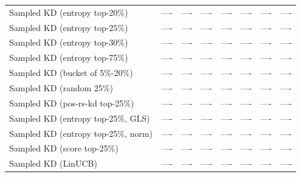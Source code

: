 \documentclass[11pt]{article}
\begin{document}
\begin{table}[t]
{\begin{tabular}{lccccccc}
		Sampled KD (entropy top-20\%)              & ----    & ----                  & ----                      & ----                 & ----                        & ----                    & ----          \\
		Sampled KD (entropy top-25\%)              & ----    & ----                  & ----                      & ----                 & ----                        & ----                    & ----          \\
		Sampled KD (entropy top-30\%)              & ----    & ----                  & ----                      & ----                 & ----                        & ----                    & ----          \\
		Sampled KD (entropy top-75\%)              & ----    & ----                  & ----                      & ----                 & ----                        & ----                    & ----          \\
		Sampled KD (bucket of 5\%-20\%)  		   & ----    & ----                  & ----                      & ----                 & ----                        & ----                    & ----          \\
		Sampled KD (random 25\%)         		   & ----    & ----                  & ----                      & ----                 & ----                        & ----                    & ----          \\
		Sampled KD (pos-rs-kd top-25\%)            & ----    & ----                  & ----                      & ----                 & ----                        & ----                    & ----          \\
		Sampled KD (entropy top-25\%, GLS) 		   & ----    & ----                  & ----                      & ----                 & ----                        & ----                    & ----          \\
		Sampled KD (entropy top-25\%, norm)		   & ----    & ----                  & ----                      & ----                 & ----                        & ----                    & ----          \\
		Sampled KD (score top-25\%)         	   & ----    & ----                  & ----                      & ----                 & ----                        & ----                    & ----          \\
		Sampled KD (LinUCB)			               & ----    & ----                  & ----                      & ----                 & ----                        & ----                    & ----          \\

\end{tabular}}
\end{table}
\end{document}
